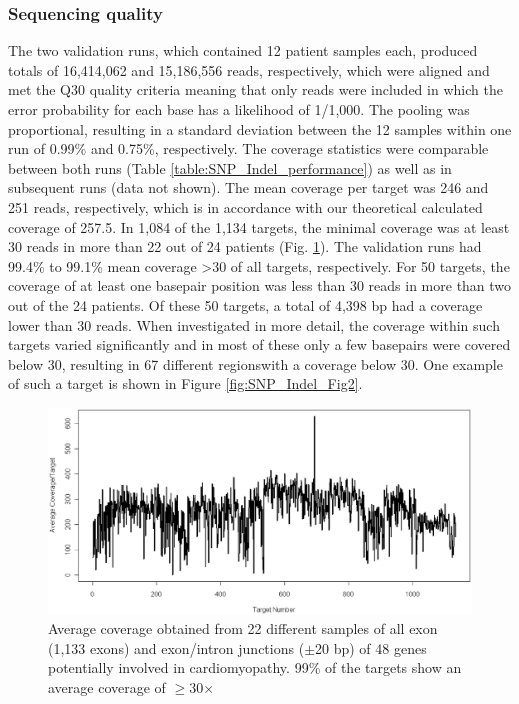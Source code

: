 \subsubsection{Sequencing quality}
The two validation runs, which contained 12 patient samples each, produced totals of 16,414,062 and 15,186,556 reads, respectively, which were aligned and met the Q30 quality criteria meaning that only reads were included in which the error probability for each base has a likelihood of 1/1,000. 
The pooling was proportional, resulting in a standard deviation between the 12 samples within one run of 0.99\% and 0.75\%, respectively. 
The coverage statistics were comparable between both runs (Table  \ref{table:SNP_Indel_performance}) as well as in subsequent runs (data not shown). 
The mean coverage per target was 246 and 251 reads, respectively, which is in accordance with our theoretical calculated coverage of 257.5. 
In 1,084 of the 1,134 targets, the minimal coverage was at least 30 reads in more than 22 out of 24 patients (Fig. \ref{fig:SNP_Indel_Fig1}). 
The validation runs had 99.4\% to 99.1\% mean coverage {\textgreater}30 of all targets, respectively. 
For 50 targets, the coverage of at least one basepair position was less than 30 reads in more than two out of the 24 patients. 
Of these 50 targets, a total of 4,398 bp had a coverage lower than 30 reads. 
When investigated in more detail, the coverage within such targets varied significantly and in most of these only a few basepairs were covered below 30, resulting in 67 different regionswith a coverage below 30. 
One example of such a target is shown in Figure \ref{fig:SNP_Indel_Fig2}.

\begin{figure}
	\includegraphics[width=1.0\linewidth]{img/SNP_Indel_Fig1}
	\caption[Average coverage per exon cardiomyopathy 48 gene panel]{Average coverage obtained from 22 different samples of all exon (1,133 exons) and exon/intron junctions ({$\pm$}20 bp) of 48 genes potentially involved in cardiomyopathy. 99\% of the targets show an average coverage of $\ge$30$\times$}
	\label{fig:SNP_Indel_Fig1}
\end{figure}

